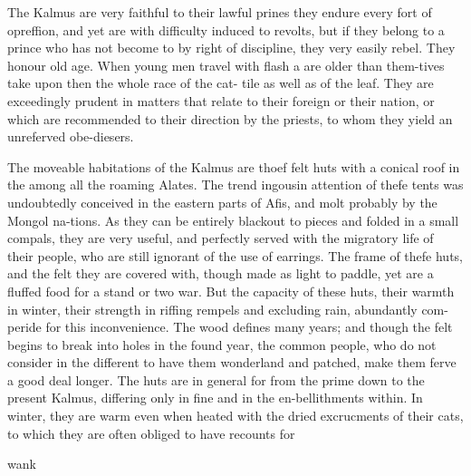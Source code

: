 The Kalmus are very faithful to their lawful prines they endure every fort of opreffion, and yet are with difficulty induced to revolts, but if they belong to a prince who has not become to by right of discipline, they very easily rebel. They honour old age. When young men travel with flash a are older than them-tives take upon then the whole race of the cat- tile as well as of the leaf. They are exceedingly prudent in matters that relate to their foreign or their nation, or which are recommended to their direction by the priests, to whom they yield an unreferved obe-diesers.\par\medskip
The moveable habitations of the Kalmus are thoef felt huts with a conical roof in the among all the roaming Alates. The trend ingousin attention of thefe tents was undoubtedly conceived in the eastern parts of Afis, and molt probably by the Mongol na-tions. As they can be entirely blackout to pieces and folded in a small compals, they are very useful, and perfectly served with the migratory life of their people, who are still ignorant of the use of earrings. The frame of thefe huts, and the felt they are covered with, though made as light to paddle, yet are a fluffed food for a stand or two war. But the capacity of these huts, their warmth in winter, their strength in riffing rempels and excluding rain, abundantly com-peride for this inconvenience. The wood defines many years; and though the felt begins to break into holes in the found year, the common people, who do not consider in the different to have them wonderland and patched, make them ferve a good deal longer. The huts are in general for from the prime down to the present Kalmus, differing only in fine and in the en-bellithments within. In winter, they are warm even when heated with the dried excrucments of their cats, to which they are often obliged to have recounts for\par{}\par\medskip
wank\par\medskip
